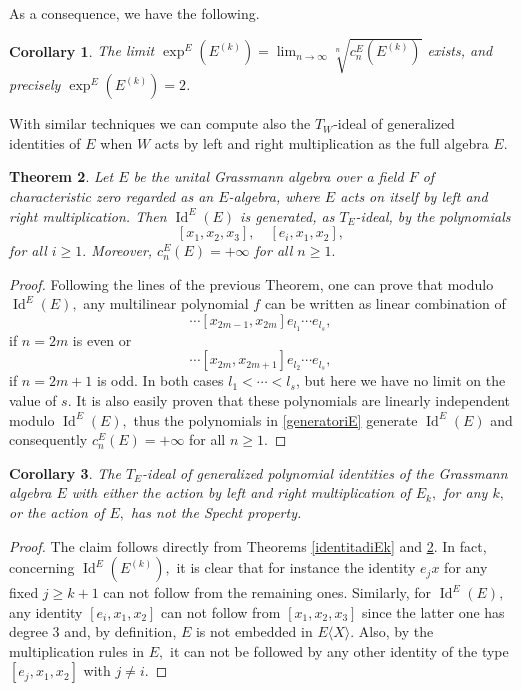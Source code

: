\documentclass[reqno]{amsart}
\newtheorem{theorem}{Theorem}
\newtheorem{corollary}[theorem]{Corollary}
\theoremstyle{definition}
\numberwithin{equation}{section}
\numberwithin{theorem}{section}
\DeclareMathOperator{\I}{Id}
\begin{document}
As a consequence, we have the following.

\begin{corollary}\label{cor: exp of E}
    The limit $ \exp^E(E^{(k)})=\lim_{n\to \infty}\sqrt[n]{c_n^E(E^{(k)})}$ exists, and precisely $\exp^E(E^{(k)})=2$.
\end{corollary}



With similar techniques we can compute also the $T_W$-ideal of generalized identities of $E$ when $W$ acts by left and right multiplication as the full algebra $E.$

\begin{theorem}\label{identitadiE}
    Let $E$ be the unital Grassmann algebra over a field $F$ of characteristic zero regarded as an $E$-algebra, where $E$ acts on itself by left and right multiplication. Then $\I^{E}(E)$ is generated, as $T_E$-ideal, by the polynomials 
    \begin{equation}\label{generatoriE}
    [x_1,x_2,x_3], \quad [e_i,x_1,x_2],
\end{equation}
for all $i\geq 1.$ Moreover, $c^{E}_n(E) = +\infty$ for all $n\geq 1.$
\end{theorem}
\begin{proof}
    Following the lines of the previous Theorem, one can prove that modulo $\I^E(E),$ any multilinear polynomial $f$ can be written as linear combination of
    \begin{equation*}
    [x_{1},x_{2}][x_3,x_4]\cdots [x_{2m-1},x_{2m}]e_{l_1}\cdots e_{l_s},
    \end{equation*}
    if $n=2m$ is even or 
    \begin{equation*}
    [e_{l_1},x_{1}][x_2,x_3]\cdots [x_{2m},x_{2m+1}]e_{l_2}\cdots e_{l_s},
    \end{equation*}
    if $n=2m+1$ is odd. In both cases $l_1<\cdots <l_s$, but here we have no limit on the value of $s.$ It is also easily proven that these polynomials are linearly independent modulo $\I^E(E),$ thus the polynomials in \eqref{generatoriE} generate $\I^E(E)$ and consequently $c_n^E(E)=+\infty$ for all $n\geq 1.$
\end{proof}

\begin{corollary}
    The $T_E$-ideal of generalized polynomial identities of the Grassmann algebra $E$ with either the action by left and right multiplication of $E_k,$ for any $k,$ or the action of $E,$ has not the Specht property.
\end{corollary}
\begin{proof}
    The claim follows directly from Theorems \ref{identitadiEk} and \ref{identitadiE}. In fact, concerning $\I^E(E^{(k)}),$ it is clear that for instance the identity $e_jx$ for any fixed $j\geq k+1$ can not follow from the remaining ones. Similarly, for $\I^E(E),$ any identity $[e_i,x_1,x_2]$ can not follow from $[x_1,x_2,x_3]$ since the latter one has degree 3 and, by definition, $E$ is not embedded in $E\langle X\rangle$. Also, by the multiplication rules in $E,$ it can not be followed by any other identity of the type $[e_j,x_1,x_2]$ with $j\neq i.$
\end{proof}
\end{document}
